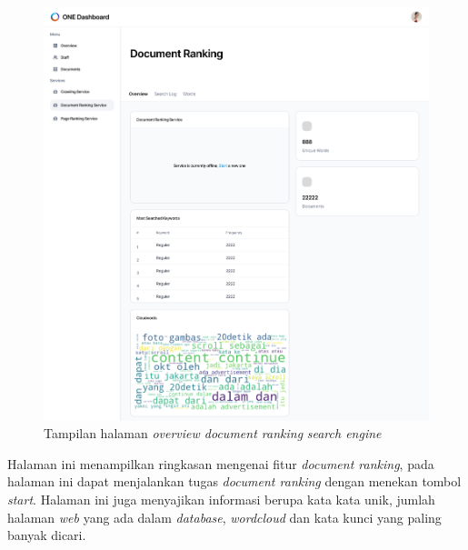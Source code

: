 \begin{enumerate}[label=\alph*)., leftmargin=1\parindent]
	\begin{figure}[H]
		\centering
		\includegraphics[keepaspectratio, width=13cm]{gambar/uiux_documentranking_overview.png}
		\caption{Tampilan halaman \textit{overview document ranking} \textit{search engine}}
		\label{gambar:uiux_documentranking_overview.png}
	\end{figure}

	Halaman ini menampilkan ringkasan mengenai fitur \textit{document ranking}, pada halaman ini dapat menjalankan tugas \textit{document ranking} dengan menekan tombol \textit{start}. Halaman ini juga menyajikan informasi berupa kata kata unik, jumlah halaman \textit{web} yang ada dalam \textit{database}, \textit{wordcloud} dan kata kunci yang paling banyak dicari.



\end{enumerate}
